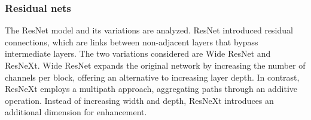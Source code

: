 





\FloatBarrier

\subsubsection{Residual nets}

The ResNet model and its variations are analyzed. ResNet introduced residual connections, which are links between non-adjacent layers that bypass intermediate layers. The two variations considered are Wide ResNet and ResNeXt. Wide ResNet expands the original network by increasing the number of channels per block, offering an alternative to increasing layer depth. In contrast, ResNeXt employs a multipath approach, aggregating paths through an additive operation. Instead of increasing width and depth, ResNeXt introduces an additional dimension for enhancement.


